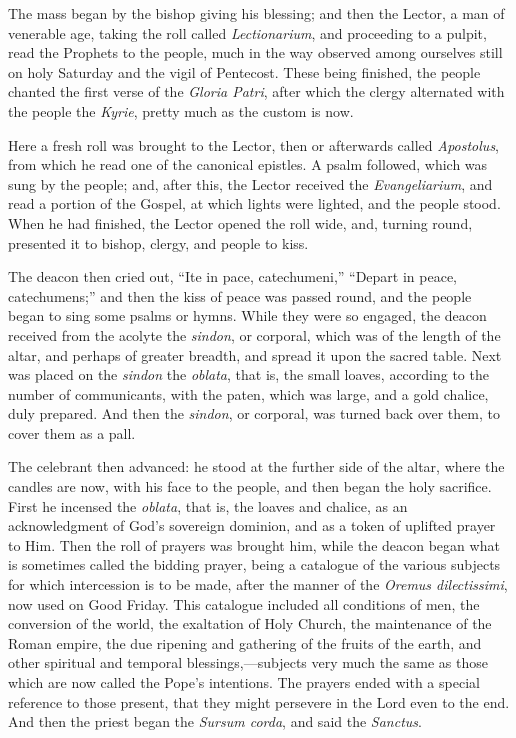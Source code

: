 The mass began by the bishop giving his blessing; and then the
Lector, a man of venerable age, taking the roll called \emph{Lectionarium},
and proceeding to a pulpit, read the Prophets to the people, much in
the way observed among ourselves still on holy Saturday and the vigil
of Pentecost. These being finished, the people chanted the first verse
of the \emph{Gloria Patri}, after which the clergy alternated
with the people the \emph{Kyrie}, pretty much as the custom is now.

Here a fresh roll was brought to the Lector, then or afterwards
called \emph{Apostolus}, from which he read one of the canonical
epistles. A psalm followed, which was sung by the people; and, after
this, the Lector received the \emph{Evangeliarium}, and read a portion
of the Gospel, at which lights were lighted, and the people stood.
When he had finished, the Lector opened the roll wide, and, turning
round, presented it to bishop, clergy, and people to kiss.

The deacon then cried out, ``Ite in pace, catechumeni,''
``Depart in peace, catechumens;'' and then the kiss of peace
was passed round, and the people began to sing some psalms or hymns.
While they were so engaged, the deacon received from the acolyte the \emph{sindon},
or corporal, which was of the length of the altar, and perhaps of
greater breadth, and spread it upon the sacred table. Next was placed
on the \emph{sindon} the \emph{oblata}, that is, the small loaves,
according to the number of communicants, with the paten, which was
large, and a gold chalice, duly prepared. And then the \emph{sindon},
or corporal, was turned back over them, to cover them as a pall.

The celebrant then advanced: he stood at the further side of the
altar, where the candles are now, with his face to the people, and
then began the holy sacrifice. First he incensed the \emph{oblata},
that is, the loaves and chalice, as an acknowledgment of God's
sovereign dominion, and as a token of uplifted prayer to Him.
Then the roll of prayers was brought him, while the deacon began what
is sometimes called the bidding prayer, being a catalogue of the
various subjects for which intercession is to be made, after the
manner of the \emph{Oremus dilectissimi}, now used on Good Friday.
This catalogue included all conditions of men, the conversion of the
world, the exaltation of Holy Church, the maintenance of the Roman
empire, the due ripening and gathering of the fruits of the earth, and
other spiritual and temporal blessings,—subjects very much the same
as those which are now called the Pope's intentions. The prayers ended
with a special reference to those present, that they might persevere
in the Lord even to the end. And then the priest began the \emph{Sursum
corda}, and said the \emph{Sanctus}.

